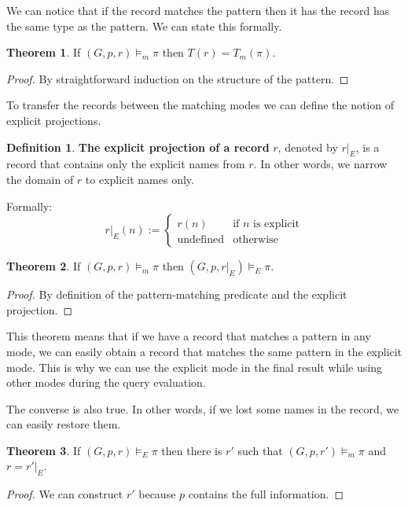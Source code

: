 \documentclass[14pt]{constructor-thesis}
\theoremstyle{definition}
\newtheorem{theorem}{Theorem}
\newtheorem{definition}{Definition}
\begin{document}
We can notice that if the record matches the pattern then it has the record has the same type as the pattern. We can state this formally.
\begin{theorem}
  \label{thm:matching-mode-type}
  If $(G, p, r) \models_m \pi$ then $T(r) = T_m(\pi)$.
\end{theorem}
\begin{proof}
  By straightforward induction on the structure of the pattern.
\end{proof}

To transfer the records between the matching modes we can define the notion of explicit projections.

\begin{definition}
  \textbf{The explicit projection of a record} $r$, denoted by $r |_E$, is a record that contains only the explicit names from $r$. In other words, we narrow the domain of $r$ to explicit names only.

  Formally:
  $$ r|_E(n) :=
    \begin{cases}
      r(n) & \text{if $n$ is explicit} \\
      \text{undefined} & \text{otherwise}
    \end{cases} $$
\end{definition}

\begin{theorem}
  \label{thm:matching-mode-narrow}
  If $(G, p, r)\models_m \pi$ then $(G, p, r |_E) \models_E \pi$.
\end{theorem}
\begin{proof}
  By definition of the pattern-matching predicate and the explicit projection.
\end{proof}

This theorem means that if we have a record that matches a pattern in any mode, we can easily obtain a record that matches the same pattern in the explicit mode. This is why we can use the explicit mode in the final result while using other modes during the query evaluation.

The converse is also true. In other words, if we lost some names in the record, we can easily restore them.
\begin{theorem}
  \label{thm:matching-mode-widen}
  If $(G, p, r) \models_E \pi$ then there is $r'$ such that $(G, p, r')\models_m \pi$ and $r = r'|_E$.
\end{theorem}
\begin{proof}
  We can construct $r'$ because $p$ contains the full information.
\end{proof}
\end{document}
